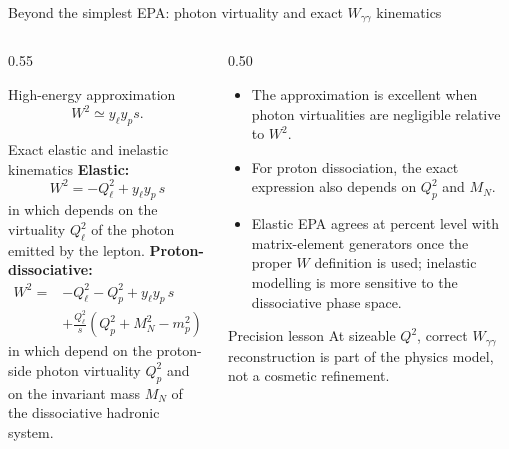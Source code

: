 \documentclass[aspectratio=1610,english]{beamer}
\begin{document}
\begin{frame}{Beyond the simplest EPA: photon virtuality and exact $W_{\gamma\gamma}$ kinematics}

\vspace{-0.2cm}

\begin{columns}%
	
\begin{column}{0.55\textwidth}
			
\begin{block}{High-energy approximation}
\small
\[
W^2\simeq y_\ell y_p s.
\]
\end{block}

\vspace{-0.3cm}

\begin{alertblock}{Exact elastic and inelastic kinematics}
\small
\textbf{\textcolor{LHGreen}{Elastic:}}
\[
W^2
=
-Q_\ell^2
+
y_\ell y_p\,s
\]
in which depends on the virtuality
$Q_\ell^2$ of the photon emitted by the lepton.
\textbf{\textcolor{LHRed}{Proton-dissociative:}}
\[
\begin{aligned}
W^2 ={}&
-Q_\ell^2 - Q_p^2 + y_\ell y_p\,s
\\[0.15em]
&+
\frac{Q_\ell^2}{s}
\left(Q_p^2 + M_N^2 - m_p^2\right)
\end{aligned}
\]
\footnotesize \justifying 
in which depend on the proton-side
photon virtuality $Q_p^2$ and on the invariant mass $M_N$ of the dissociative hadronic system.
	
\end{alertblock}

\end{column}

\begin{column}{0.50\textwidth}
\begin{itemize}
\scriptsize \justifying 
\item The approximation is excellent when photon virtualities are negligible relative to $W^2$.
\item For proton dissociation, the exact expression also depends on $Q_p^2$ and $M_N$.
\item Elastic EPA agrees at percent level with matrix-element generators once the 
proper $W$ definition is used; inelastic modelling is more sensitive to the dissociative phase space.
\end{itemize}

\begin{block}{Precision lesson}
\scriptsize
At sizeable $Q^2$, correct $W_{\gamma\gamma}$ reconstruction is part of the physics model, not a cosmetic refinement.
\end{block}


\end{column}
\end{columns}
\end{frame}
\end{document}
